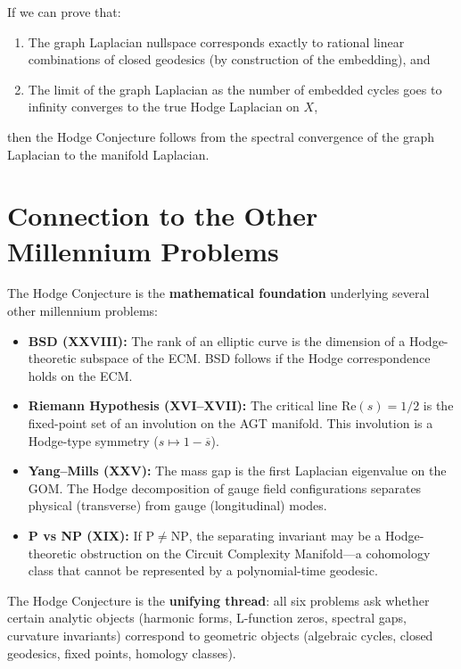 \documentclass{article}
\begin{document}
If we can prove that:
\begin{enumerate}
  \item The graph Laplacian nullspace corresponds exactly to rational
    linear combinations of closed geodesics (by construction of the
    embedding), and
  \item The limit of the graph Laplacian as the number of embedded cycles
    goes to infinity converges to the true Hodge Laplacian on $X$,
\end{enumerate}
then the Hodge Conjecture follows from the spectral convergence of the
graph Laplacian to the manifold Laplacian.

\section{Connection to the Other Millennium Problems}
\label{sec:connections}

The Hodge Conjecture is the \textbf{mathematical foundation} underlying
several other millennium problems:

\begin{itemize}
  \item \textbf{BSD (XXVIII):} The rank of an elliptic curve is the
    dimension of a Hodge-theoretic subspace of the ECM.  BSD follows if
    the Hodge correspondence holds on the ECM.
  \item \textbf{Riemann Hypothesis (XVI--XVII):} The critical line
    $\mathrm{Re}(s) = 1/2$ is the fixed-point set of an involution on
    the AGT manifold.  This involution is a Hodge-type symmetry
    ($s \mapsto 1 - \overline{s}$).
  \item \textbf{Yang--Mills (XXV):} The mass gap is the first Laplacian
    eigenvalue on the GOM.  The Hodge decomposition of gauge field
    configurations separates physical (transverse) from gauge (longitudinal)
    modes.
  \item \textbf{P vs NP (XIX):} If $\mathrm{P} \neq \mathrm{NP}$, the
    separating invariant may be a Hodge-theoretic obstruction on the
    Circuit Complexity Manifold---a cohomology class that cannot be
    represented by a polynomial-time geodesic.
\end{itemize}

The Hodge Conjecture is the \textbf{unifying thread}: all six problems ask
whether certain analytic objects (harmonic forms, L-function zeros, spectral
gaps, curvature invariants) correspond to geometric objects (algebraic cycles,
closed geodesics, fixed points, homology classes).
\end{document}
